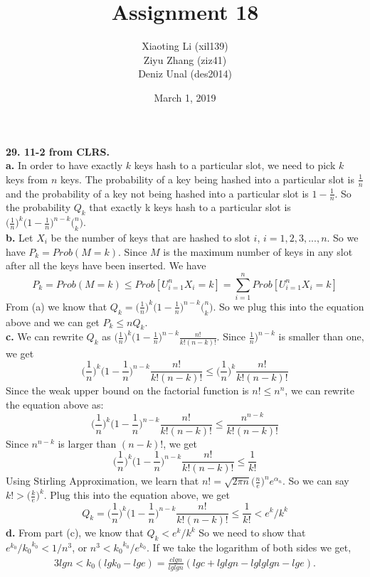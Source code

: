 \documentclass{article}
\title{Assignment 18}
\author{Xiaoting Li (xil139) \\
Ziyu Zhang (ziz41) \\
Deniz Unal (des2014)}
\date{March 1, 2019}
\begin{document}
\maketitle

\noindent
\textbf{29. 11-2 from CLRS.}\\ \newline
\textbf{a.} In order to have exactly $k$ keys hash to a particular slot, we need to pick $k$ keys from $n$ keys. The probability of a key being hashed into a particular slot is $\frac{1}{n}$ and the probability of a key not being hashed into a particular slot is $1 - \frac{1}{n}$. So the probability $Q_k$ that exactly k keys hash to a particular slot is $\big(\frac{1}{n})^k\big(1 - \frac{1}{n})^{n-k}\big(_k^n)$. \\ \newline 
\textbf{b.} Let $X_i$ be the number of keys that are hashed to slot $i$, $i = 1, 2, 3, ..., n$. So we have $P_k = Prob(M = k)$. Since $M$ is the maximum number of keys in any slot after all the keys have been inserted. We have $$P_k = Prob(M = k) \leq Prob[U_{i=1}^{n}X_i = k] = \sum_{i=1}^{n}Prob[U_{i=1}^{n}X_i = k]$$
From (a) we know that $Q_k = \big(\frac{1}{n})^k\big(1 - \frac{1}{n})^{n-k}\big(_k^n)$. So we plug this into the equation above and we can get $P_k \leq nQ_k$. \\ \newline
\textbf{c.} We can rewrite $Q_k$ as $\big(\frac{1}{n})^k\big(1 - \frac{1}{n})^{n-k}\frac{n!}{k!(n-k)!}$. Since $\frac{1}{n})^{n-k}$ is smaller than one, we get $$\big(\frac{1}{n})^k\big(1 - \frac{1}{n})^{n-k}\frac{n!}{k!(n-k)!} \leq \big(\frac{1}{n})^k \frac{n!}{k!(n-k)!}$$
Since the weak upper bound on the factorial function is $n! \leq n^n$, we can rewrite the equation above as: $$\big(\frac{1}{n})^k\big(1 - \frac{1}{n})^{n-k}\frac{n!}{k!(n-k)!} \leq \frac{n^{n-k}}{k!(n - k)!}$$
Since $n^{n-k}$ is larger than $(n - k)!$, we get $$\big(\frac{1}{n})^k\big(1 - \frac{1}{n})^{n-k}\frac{n!}{k!(n-k)!} \leq \frac{1}{k!}$$
Using Stirling Approximation, we learn that $n! = \sqrt{2\pi n}\big(\frac{n}{e})^n e^{\alpha_n}$. So we can say $k! > \big(\frac{k}{e})^k$. Plug this into the equation above, we get 
$$Q_k = \big(\frac{1}{n})^k\big(1 - \frac{1}{n})^{n-k}\frac{n!}{k!(n-k)!} \leq \frac{1}{k!} < e^k/k^k$$
\textbf{d.} From part (c), we know that $Q_k < e^k/k^k$ So we need to show that $e^{k_0}/{k_0}^{k_0} < 1/n^3$, or $n^3 < {k_0}^{k_0}/e^{k_0}$. If we take the logarithm of both sides we get,
\begin{align*}
3lgn < k_0(lgk_0 - lge) = \frac {clgn}{lglgn}(lgc + lglgn - lglglgn - lge).
\end{align*}
\end{document}
